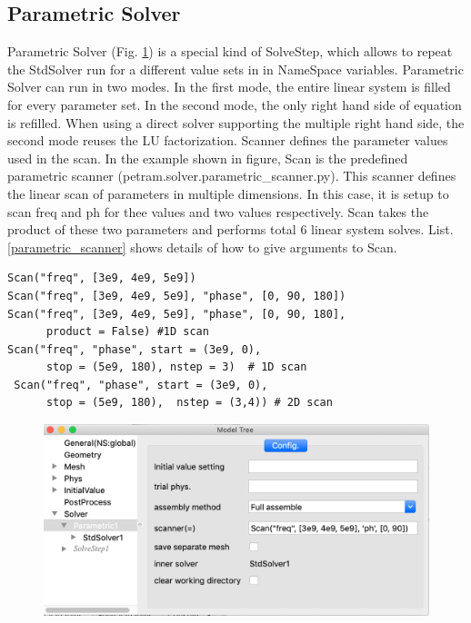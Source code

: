 \documentclass[11pt,a4paper,final]{report}
\begin{document}
\subsection{Parametric Solver}
Parametric Solver (Fig. \ref{parametric_scan}) is a special kind of SolveStep, which allows to repeat the StdSolver run for a different value sets in   in NameSpace variables. 
Parametric Solver can run in two modes. In the first mode, the entire linear system is filled for every parameter set.
In the second mode, the only right hand side of equation is refilled. When using a direct solver supporting the multiple
right hand side, the second mode reuses the LU factorization. 
Scanner defines the parameter values used in the scan.  In the example shown in figure, Scan is the predefined parametric scanner (petram.solver.parametric\_scanner.py). 
This scanner defines the linear scan of parameters in multiple dimensions. 
In this case, it is setup to scan freq and ph for thee values and two values respectively. 
Scan takes the product of these two parameters and performs total 6 linear system solves.
List. \ref{parametric_scanner} shows details of how to give arguments to Scan.

\begin{minipage}[c]{0.95\textwidth}
\begin{lstlisting}[caption={Parametric Scanner},captionpos=b, frame=single, label={parametric_scanner}]
Scan("freq", [3e9, 4e9, 5e9])
Scan("freq", [3e9, 4e9, 5e9], "phase", [0, 90, 180])
Scan("freq", [3e9, 4e9, 5e9], "phase", [0, 90, 180], 
      product = False) #1D scan
Scan("freq", "phase", start = (3e9, 0), 
      stop = (5e9, 180), nstep = 3)  # 1D scan 
 Scan("freq", "phase", start = (3e9, 0), 
      stop = (5e9, 180),  nstep = (3,4)) # 2D scan 
\end{lstlisting}
\end{minipage}

\begin{figure}
\centering
\includegraphics[width=0.95\columnwidth]{figures/parametric_scan.png} 
\caption{  }\label{parametric_scan}
\end{figure}
\end{document}
